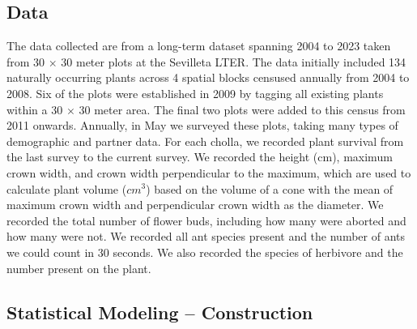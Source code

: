 \documentclass[11pt]{article}\usepackage[sc]{mathpazo} %
\begin{document}
	\subsection*{Data}
	
  The data collected are from a long-term dataset spanning 2004 to 2023 taken from 30 $\times$ 30 meter plots at the Sevilleta LTER. 
The data initially included 134 naturally occurring plants across 4 spatial blocks censused annually from 2004 to 2008.
Six of the plots were established in 2009 by tagging all existing plants within a 30 $\times$ 30 meter area. 
The final two plots were added to this census from 2011 onwards. 
Annually, in May we surveyed these plots, taking many types of demographic and partner data. 
For each cholla, we recorded plant survival from the last survey to the current survey. 
We recorded the height (cm), maximum crown width, and crown width perpendicular to the maximum, which are used to calculate plant volume ($cm^3$) based on the volume of a cone with the mean of maximum crown width and perpendicular crown width as the diameter. 
We recorded the total number of flower buds, including how many were aborted and how many were not. We recorded all ant species present and the number of ants we could count in 30 seconds. 
We also recorded the species of herbivore and the number present on the plant.
		
	\subsection*{Statistical Modeling -- Construction}
	
\end{document}
